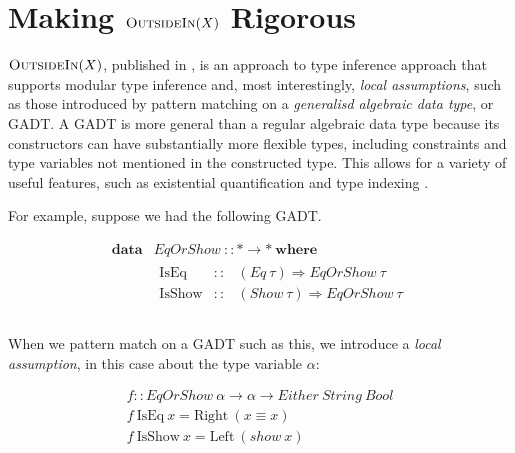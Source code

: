 \documentclass[a4paper]{jfp}
\newcommand{\outsidein}{\textsc{OutsideIn}(X)}
\begin{document}
\newpage

\section{Making $\outsidein$ Rigorous}

$\outsidein$, published in \cite{Vytiniotis:2011:OMT:2139531.2139533}, is an approach to type inference approach that supports modular type inference
and, most interestingly, \emph{local assumptions}, such as those introduced by pattern matching on a \emph{generalisd algebraic data type}, or GADT\@.
A GADT is more general than a regular algebraic data type because its constructors can have substantially more flexible types, including constraints
and type variables not mentioned in the constructed type. This allows for a variety of useful features, such as existential quantification and type
indexing \cite{Schrijvers:2009jg}.

For example, suppose we had the following GADT.

\begin{displaymath}
	\begin{array}{ll}		
		\textbf{data} & \mathit{EqOrShow}\ :: \mathtt{*} \rightarrow \mathtt{*}\ \textbf{where} \\
		              & \begin{array}{lcl}
                         \text{IsEq} & :: & (\mathit{Eq}\ \tau) \Rightarrow \mathit{EqOrShow}\ \tau \\
                         \text{IsShow} & :: & (\mathit{Show}\ \tau) \Rightarrow \mathit{EqOrShow}\ \tau \\
					    \end{array} \\						
     \end{array}
\end{displaymath}

\medskip

When we pattern match on a GADT such as this, we introduce a \emph{local assumption}, in this case about the type variable $\alpha$:

\begin{displaymath}
\begin{array}{ll}
\mathit{f} :: \mathit{EqOrShow}\ \alpha \rightarrow \alpha \rightarrow \mathit{Either}\ \mathit{String}\ \mathit{Bool} \\
\mathit{f}\ \text{IsEq}\  x = \text{Right}\ (x \equiv x) \\ 
\mathit{f}\  \text{IsShow}\  x = \text{Left}\ (\mathit{show}\ x)\\
\end{array}
\end{displaymath}
\end{document}
